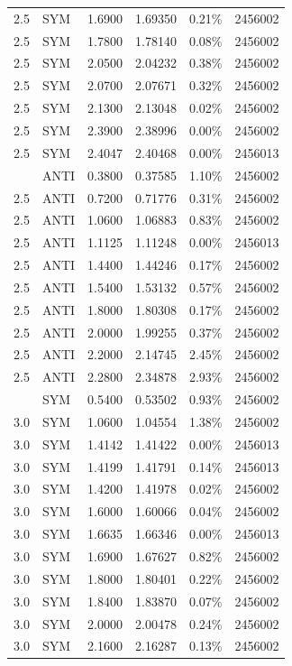 \begin{center}
\begin{longtable}{@{}rllrrr@{}}
2.5 & SYM & 1.6900 & 1.69350 & 0.21\% & 2456002 \\
2.5 & SYM & 1.7800 & 1.78140 & 0.08\% & 2456002 \\
2.5 & SYM & 2.0500 & 2.04232 & 0.38\% & 2456002 \\
2.5 & SYM & 2.0700 & 2.07671 & 0.32\% & 2456002 \\
2.5 & SYM & 2.1300 & 2.13048 & 0.02\% & 2456002 \\
2.5 & SYM & 2.3900 & 2.38996 & 0.00\% & 2456002 \\
2.5 & SYM & 2.4047 & 2.40468 & 0.00\% & 2456013 \\
\addlinespace
2.5 & ANTI & 0.3800 & 0.37585 & 1.10\% & 2456002 \\
2.5 & ANTI & 0.7200 & 0.71776 & 0.31\% & 2456002 \\
2.5 & ANTI & 1.0600 & 1.06883 & 0.83\% & 2456002 \\
2.5 & ANTI & 1.1125 & 1.11248 & 0.00\% & 2456013 \\
2.5 & ANTI & 1.4400 & 1.44246 & 0.17\% & 2456002 \\
2.5 & ANTI & 1.5400 & 1.53132 & 0.57\% & 2456002 \\
2.5 & ANTI & 1.8000 & 1.80308 & 0.17\% & 2456002 \\
2.5 & ANTI & 2.0000 & 1.99255 & 0.37\% & 2456002 \\
2.5 & ANTI & 2.2000 & 2.14745 & 2.45\% & 2456002 \\
2.5 & ANTI & 2.2800 & 2.34878 & 2.93\% & 2456002 \\
\addlinespace
3.0 & SYM & 0.5400 & 0.53502 & 0.93\% & 2456002 \\
3.0 & SYM & 1.0600 & 1.04554 & 1.38\% & 2456002 \\
3.0 & SYM & 1.4142 & 1.41422 & 0.00\% & 2456013 \\
3.0 & SYM & 1.4199 & 1.41791 & 0.14\% & 2456013 \\
3.0 & SYM & 1.4200 & 1.41978 & 0.02\% & 2456002 \\
3.0 & SYM & 1.6000 & 1.60066 & 0.04\% & 2456002 \\
3.0 & SYM & 1.6635 & 1.66346 & 0.00\% & 2456013 \\
3.0 & SYM & 1.6900 & 1.67627 & 0.82\% & 2456002 \\
3.0 & SYM & 1.8000 & 1.80401 & 0.22\% & 2456002 \\
3.0 & SYM & 1.8400 & 1.83870 & 0.07\% & 2456002 \\
3.0 & SYM & 2.0000 & 2.00478 & 0.24\% & 2456002 \\
3.0 & SYM & 2.1600 & 2.16287 & 0.13\% & 2456002 \\

\end{longtable}
\end{center}
